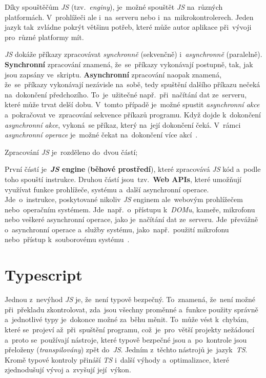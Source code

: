 \documentclass[11pt,a4paper]{report}
\let\oldacrshort\acrshort
\renewcommand{\acrshort}[1]{\emph{\normalsize\color[rgb]{0,0,0}\noindent\oldacrshort{#1}}}
\begin{document}
            Díky spouštěčům \acrshort{JS} (tzv.~\emph{enginy}), je~možné spouštět \acrshort{JS} na~různých platformách. V~prohlížeči ale i~na~serveru nebo i~na~mikrokontrolerech. Jeden jazyk tak~zvládne pokrýt většinu potřeb, které může autor aplikace při~vývoji pro~různé platformy mít.

            \acrshort{JS} dokáže příkazy zpracovávat \emph{synchronně} (sekvenčně) i~\emph{asynchronně} (paralelně). \textbf{Synchronní} zpracování znamená, že~se~příkazy vykonávají postupně, tak, jak jsou zapsány ve~skriptu. \textbf{Asynchronní} zpracování naopak znamená, že~se~příkazy vykonávají nezávisle na~sobě, tedy spuštění dalšího příkazu nečeká na~dokončení předchozího. To~je~užitečné např.~při~načítání dat ze~serveru, které může trvat delší dobu. V~tomto případě je~možné spustit \emph{asynchronní akce} a~pokračovat ve~zpracování sekvence příkazů programu. Když dojde k~dokončení \emph{asynchronní akce}, vykoná~se příkaz, který na~její dokončení čeká. V~rámci \emph{asynchronní operace} je~možné čekat na~dokončení více akcí~\cite{ajax:mdn, Scott2019:programmingpragmatics}.

            Zpracování \acrshort{JS} je~rozděleno do~dvou částí;
            
            První částí je~\textbf{\acrshort{JS} engine} (\textbf{běhové prostředí}), které zpracovává \acrshort{JS} kód a~podle toho spouští instrukce. Druhou částí jsou~tzv.~\textbf{Web APIs}, které umožňují využívat funkce prohlížeče, systému a~další {asynchronní} operace. Jde~o~instrukce, poskytované nikoliv \acrshort{JS} enginem ale~webovým prohlížečem nebo~operačním systémem. Jde~např.~o~přístupu k~\emph{DOMu}, kameře, mikrofonu nebo veškeré asynchronní operace, jako je~načítání dat ze~serveru. Jde~převážně o~asynchronní operace a~služby systému, jako~např.~použití mikrofonu nebo~přístup k~souborovému systému~\cite{kantor_javascript}.

        \section{Typescript}
            Jednou z~nevýhod \acrshort{JS} je, že~není typově bezpečný. To~znamená, že~není možné při~překladu zkontrolovat, zda~jsou všechny proměnné a~funkce použity správně a~jednotlivé typy je~dokonce možné za~běhu měnit. To~může vést k~chybám, které se~projeví až~při~spuštění programu, což~je~pro~větší projekty nežádoucí a~proto se~používají nástroje, které typově bezpečné jsou a~po~kontrole jsou přeloženy (\emph{transpilovány}) zpět do~\acrshort{JS}. Jedním z~těchto nástrojů je~jazyk~\acrshort{TS}. Kromě typové kontroly přináší \acrshort{TS} i~další výhody a~optimalizace, které zjednodušují vývoj a~zvyšují její~výkon.
\end{document}
